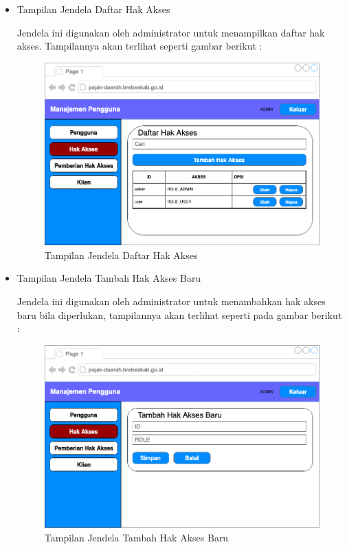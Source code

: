 \documentclass[pdftex,12pt, oneside]{article}
\begin{document}
\begin{itemize}
	\item Tampilan Jendela Daftar Hak Akses
	
	Jendela ini digunakan oleh administrator untuk menampilkan daftar hak akses. Tampilannya akan terlihat seperti gambar berikut :
	
	\begin{figure}[H]
		\centering
		\includegraphics[width=1\textwidth]{./resources/list-role-ui}
		\caption{Tampilan Jendela Daftar Hak Akses}
		\label{fig:list-role-ui}
	\end{figure}
	
	\item Tampilan Jendela Tambah Hak Akses Baru
	
	Jendela ini digunakan oleh administrator untuk menambahkan hak akses baru bila diperlukan, tampilannya akan terlihat seperti pada gambar berikut :
	
	\begin{figure}[H]
		\centering
		\includegraphics[width=1\textwidth]{./resources/add-role-ui}
		\caption{Tampilan Jendela Tambah Hak Akses Baru}
		\label{fig:add-role-ui}
	\end{figure}
	

\end{itemize}
\end{document}
